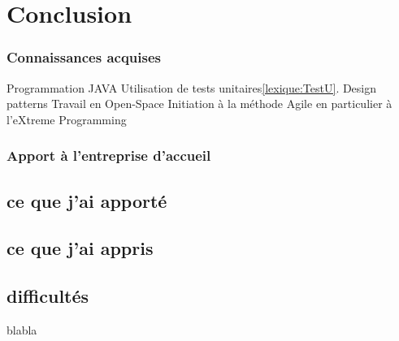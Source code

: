 \chapter{Conclusion}
\subsection{Connaissances acquises}
Programmation JAVA
Utilisation de tests unitaires\ref{lexique:TestU}.
Design patterns
Travail en Open-Space
Initiation à la méthode Agile en particulier à l'eXtreme Programming

\subsection{Apport à l'entreprise d'accueil}
\section{ce que j'ai apporté}
\section{ce que j'ai appris}
\section{difficultés}
blabla
